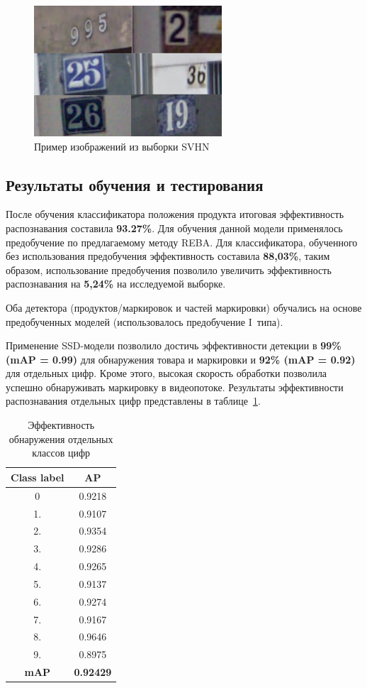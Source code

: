 \begin{figure}[ht]
	\centering
	\includegraphics[width=7cm]{man-source/images/ch4/pic4-14.png}
	\caption{Пример изображений из выборки SVHN}
	\label{fig:svhn_dataset}
\end{figure}

\subsection{Результаты обучения и тестирования} 
После обучения классификатора положения продукта итоговая эффективность распознавания составила \textbf{93.27\%}. Для обучения данной модели применялось предобучение по предлагаемому методу REBA.
Для классификатора, обученного без использования предобучения эффективность составила \textbf{88,03\%}, таким образом, использование предобучения позволило увеличить эффективность распознавания на \textbf{5,24\%} на исследуемой выборке.

Оба детектора (продуктов/маркировок и частей маркировки) обучались на основе предобученных моделей (использовалось предобучение I~типа).

Применение SSD-модели позволило достичь эффективности детекции в \textbf{99\% (mAP = 0.99)} для обнаружения товара и маркировки и \textbf{92\% (mAP = 0.92)} для отдельных цифр. Кроме этого, высокая скорость обработки позволила успешно обнаруживать маркировку в видеопотоке. Результаты эффективности распознавания отдельных цифр представлены в таблице~\ref{tab:efficiency_detector1}.  

\begin{table}[h]
\caption{Эффективность обнаружения отдельных классов цифр}
\centering
\begin{tabular}{ | c | c |  }
\hline
Class label & AP \\ \hline
0 & 0.9218\\
1. & 0.9107\\
2. & 0.9354\\
3. & 0.9286\\
4. & 0.9265\\
5. & 0.9137\\
6. & 0.9274\\
7. & 0.9167\\
8. & 0.9646\\
9. & 0.8975\\
\hline
\textbf{mAP} & \textbf{0.92429}\\
\hline
\end{tabular}
\label{tab:efficiency_detector1}
\end{table}

